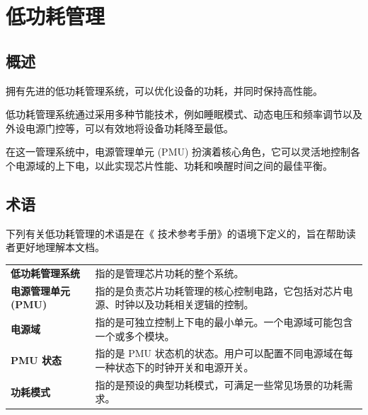 \documentclass[main\_\_CN.tex]{subfiles}
\begin{document}

\ifglobal
\else
    {\let\clearpage\relax \listoftodos}
    {\let\clearpage\relax \listofdonetodos}
    \tableofcontents
\fi



\hypertarget{lowpowm}{}
\chapter{低功耗管理}\label{mod:lowpowm}

\section{概述}

\chipname{} 拥有先进的低功耗管理系统，可以优化设备的功耗，并同时保持高性能。

低功耗管理系统通过采用多种节能技术，例如睡眠模式、动态电压和频率调节以及外设电源门控等，可以有效地将设备功耗降至最低。

在这一管理系统中，电源管理单元 (PMU) 扮演着核心角色，它可以灵活地控制各个电源域的上下电，以此实现芯片性能、功耗和唤醒时间之间的最佳平衡。

\section{术语}

下列有关低功耗管理的术语是在《\chipname{} 技术参考手册》的语境下定义的，旨在帮助读者更好地理解本文档。

\begin{longtable}[c]{ R{4cm} p{12cm} }
\textbf{低功耗管理系统} & 指的是管理芯片功耗的整个系统。\\
\textbf{电源管理单元 (PMU)} & 指的是负责芯片功耗管理的核心控制电路，它包括对芯片电源、时钟以及功耗相关逻辑的控制。\\
\textbf{电源域} & 指的是可独立控制上下电的最小单元。一个电源域可能包含一个或多个模块。 \\
\textbf{PMU 状态} & 指的是 PMU 状态机的状态。用户可以配置不同电源域在每一种状态下的时钟开关和电源开关。\\
\textbf{功耗模式} & 指的是预设的典型功耗模式，可满足一些常见场景的功耗需求。\\
\end{longtable}
\end{document}
